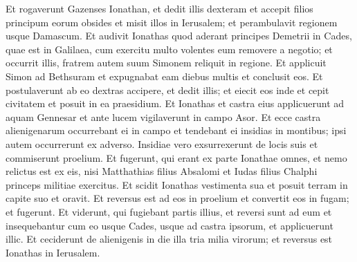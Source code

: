 \begin{biblechapter}
\verse Et rogaverunt Gazenses Ionathan, et dedit illis dexteram et accepit filios principum eorum obsides et misit illos in Ierusalem; et perambulavit regionem usque Damascum. 
\verse Et audivit Ionathas quod aderant principes Demetrii in Cades, quae est in Galilaea, cum exercitu multo volentes eum removere a negotio; 
\verse et occurrit illis, fratrem autem suum Simonem reliquit in regione. 
\verse Et applicuit Simon ad Bethsuram et expugnabat eam diebus multis et conclusit eos. 
\verse Et postulaverunt ab eo dextras accipere, et dedit illis; et eiecit eos inde et cepit civitatem et posuit in ea praesidium. 
\verse Et Ionathas et castra eius applicuerunt ad aquam Gennesar et ante lucem vigilaverunt in campo Asor. 
\verse Et ecce castra alienigenarum occurrebant ei in campo et tendebant ei insidias in montibus; ipsi autem occurrerunt ex adverso. 
\verse Insidiae vero exsurrexerunt de locis suis et commiserunt proelium. 
\verse Et fugerunt, qui erant ex parte Ionathae omnes, et nemo relictus est ex eis, nisi Matthathias filius Absalomi et Iudas filius Chalphi princeps militiae exercitus. 
\verse Et scidit Ionathas vestimenta sua et posuit terram in capite suo et oravit. 
\verse Et reversus est ad eos in proelium et convertit eos in fugam; et fugerunt. 
\verse Et viderunt, qui fugiebant partis illius, et reversi sunt ad eum et insequebantur cum eo usque Cades, usque ad castra ipsorum, et applicuerunt illic. 
\verse Et ceciderunt de alienigenis in die illa tria milia virorum; et reversus est Ionathas in Ierusalem. 
\end{biblechapter}


